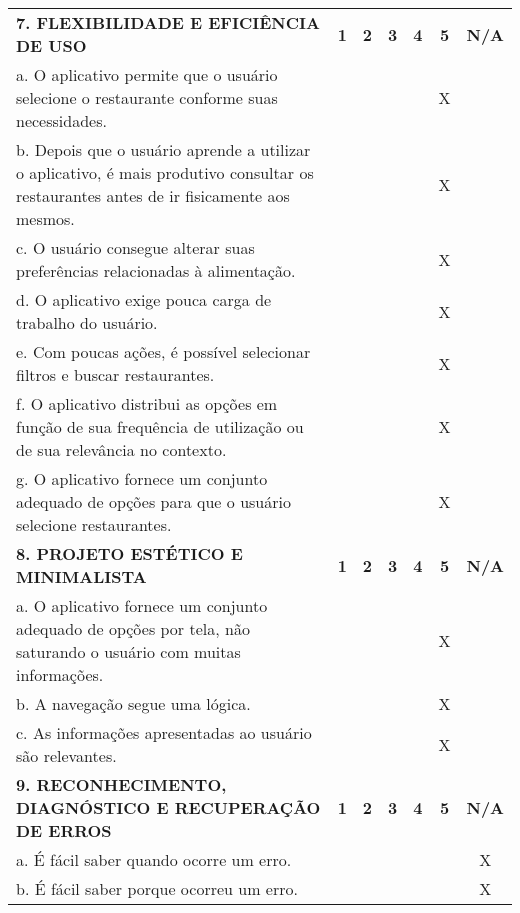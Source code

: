\documentclass[portuguese,oneside]{tcc}
\begin{document}
\begin{center}
\begin{longtabu}{|L{25em}|c|c|c|c|c|c|}
																						\textbf{7. FLEXIBILIDADE E EFICIÊNCIA DE USO} & \textbf{1} & \textbf{2} & \textbf{3} & \textbf{4} & \textbf{5} & \textbf{N/A} \\ 
																						a. O aplicativo permite que o usuário selecione o restaurante conforme suas necessidades. & & & & & X & \\ 
																						b. Depois que o usuário aprende a utilizar o aplicativo, é mais produtivo consultar os restaurantes antes de ir fisicamente aos mesmos. & & & & & X & \\ 
																						c. O usuário consegue alterar suas preferências relacionadas à alimentação. & & & & & X & \\ 
																						d. O aplicativo exige pouca carga de trabalho do usuário. & & & & & X & \\ 
																						e. Com poucas ações, é possível selecionar filtros e buscar restaurantes. & & & & & X & \\ 
																						f. O aplicativo distribui as opções em função de sua frequência de utilização ou de sua relevância no contexto.	& & & & & X & \\ 
																						g. O aplicativo fornece um conjunto adequado de opções para que o usuário selecione restaurantes. & & & & & X & \\ 
																						\textbf{8. PROJETO ESTÉTICO E MINIMALISTA} & \textbf{1} & \textbf{2} & \textbf{3} & \textbf{4} & \textbf{5} & \textbf{N/A} \\ 
																						a. O aplicativo fornece um conjunto adequado de opções por tela, não saturando o usuário com muitas informações. & & & & & X & \\ 
																						b. A navegação segue uma lógica. & & & & & X & \\ 
																						c. As informações apresentadas ao usuário são relevantes. & & & & & X & \\ 
																						\textbf{9. RECONHECIMENTO, DIAGNÓSTICO E RECUPERAÇÃO DE ERROS} & \textbf{1} & \textbf{2} & \textbf{3} & \textbf{4} & \textbf{5} & \textbf{N/A} \\ 
																						a. É fácil saber quando ocorre um erro.	& & & & & & X \\ 
																						b. É fácil saber porque ocorreu um erro. & & & & & & X \\ 

\end{longtabu}
\end{center}
\end{document}
